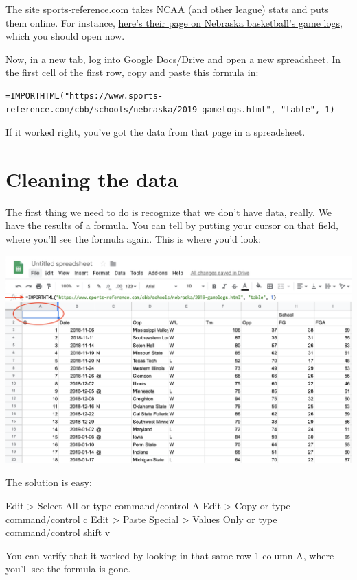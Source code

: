 \documentclass[
]{book}
\begin{document}
The site sports-reference.com takes NCAA (and other league) stats and puts them online. For instance, \href{https://www.sports-reference.com/cbb/schools/nebraska/2019-gamelogs.html}{here's their page on Nebraska basketball's game logs}, which you should open now.

Now, in a new tab, log into Google Docs/Drive and open a new spreadsheet. In the first cell of the first row, copy and paste this formula in:

\begin{verbatim}
=IMPORTHTML("https://www.sports-reference.com/cbb/schools/nebraska/2019-gamelogs.html", "table", 1)
\end{verbatim}

If it worked right, you've got the data from that page in a spreadsheet.

\hypertarget{cleaning-the-data}{%
\section{Cleaning the data}\label{cleaning-the-data}}

The first thing we need to do is recognize that we don't have data, really. We have the results of a formula. You can tell by putting your cursor on that field, where you'll see the formula again. This is where you'd look:

\includegraphics[width=33.28in]{images/clean1}

The solution is easy:

Edit \textgreater{} Select All or type command/control A
Edit \textgreater{} Copy or type command/control c
Edit \textgreater{} Paste Special \textgreater{} Values Only or type command/control shift v

You can verify that it worked by looking in that same row 1 column A, where you'll see the formula is gone.
\end{document}
